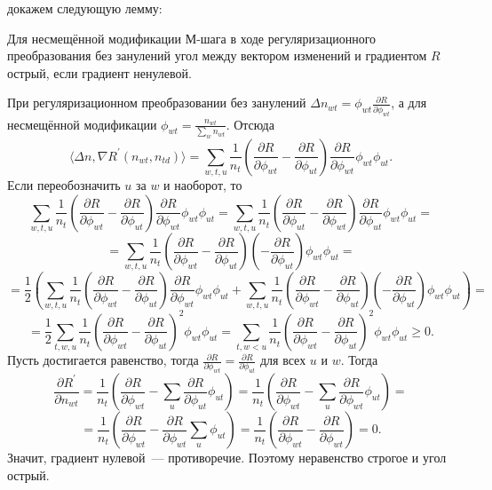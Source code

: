 \documentclass[12pt, twoside]{article}
\begin{document}
 докажем следующую лемму:
\begin{Lemma}           
Для несмещённой модификации М-шага в ходе регуляризационного преобразования  без занулений угол  между вектором изменений и градиентом $R$ острый, если градиент ненулевой.
\end{Lemma}
\begin{Proof}
При регуляризационном преобразовании без занулений $\Delta n_{wt} =  \phi_{wt} \frac{\partial{R}}{\partial{\phi_{wt}}}$, а для несмещённой модификации $\phi_{wt} = \frac{n_{wt}}{\sum\limits_w n_{wt}}$. Отсюда
\[
\langle \Delta n, \nabla R^{\prime}(n_{wt}, n_{td})\rangle = \sum\limits_{w, t, u}  \frac{1}{n_{t}}  \left(  \frac{\partial{R}}{\partial{\phi_{wt}}}  -  \frac{\partial{R}}{\partial{\phi_{ut}}}  \right)  \frac{\partial{R}}{\partial{\phi_{wt}}} \phi_{wt} \phi_{ut}.
\]
Если переобозначить $u$ за $w$ и наоборот, то 
\[
\sum\limits_{w, t, u}  \frac{1}{n_{t}}  \left(  \frac{\partial{R}}{\partial{\phi_{wt}}}  -  \frac{\partial{R}}{\partial{\phi_{ut}}}  \right)  \frac{\partial{R}}{\partial{\phi_{wt}}} \phi_{wt} \phi_{ut}  = \sum\limits_{w, t, u}  \frac{1}{n_{t}}  \left(  \frac{\partial{R}}{\partial{\phi_{ut}}}  -  \frac{\partial{R}}{\partial{\phi_{wt}}}  \right)  \frac{\partial{R}}{\partial{\phi_{ut}}} \phi_{wt} \phi_{ut} = 
\]
\[
= \sum\limits_{w, t, u}  \frac{1}{n_{t}}  \left(  \frac{\partial{R}}{\partial{\phi_{wt}}}  -  \frac{\partial{R}}{\partial{\phi_{ut}}}  \right)  \left(-\frac{\partial{R}}{\partial{\phi_{ut}}}\right) \phi_{wt} \phi_{ut} = 
\]
\[
= \frac12 \left(\sum\limits_{w, t, u}  \frac{1}{n_{t}}  \left(  \frac{\partial{R}}{\partial{\phi_{wt}}}  -  \frac{\partial{R}}{\partial{\phi_{ut}}}  \right)  \frac{\partial{R}}{\partial{\phi_{wt}}} \phi_{wt} \phi_{ut} +  \sum\limits_{w, t, u}  \frac{1}{n_{t}}  \left(  \frac{\partial{R}}{\partial{\phi_{wt}}}  -  \frac{\partial{R}}{\partial{\phi_{ut}}}  \right)  \left(-\frac{\partial{R}}{\partial{\phi_{ut}}}\right) \phi_{wt} \phi_{ut} \right)= 
\]
\[
= \frac12 \sum\limits_{t, w, u}  \frac{1}{n_{t}} \left(  \frac{\partial{R}}{\partial{\phi_{wt}}}  -  \frac{\partial{R}}{\partial{\phi_{ut}}}  \right)^2 \phi_{wt} \phi_{ut} = \sum\limits_{t, w < u}  \frac{1}{n_{t}} \left(  \frac{\partial{R}}{\partial{\phi_{wt}}}  -  \frac{\partial{R}}{\partial{\phi_{ut}}}  \right)^2 \phi_{wt} \phi_{ut} \geq 0.
\]
Пусть достигается равенство, тогда $\frac{\partial{R}}{\partial{\phi_{wt}}}  =  \frac{\partial{R}}{\partial{\phi_{ut}}}$ для всех $u$ и $w$. Тогда
\[
\frac{\partial{R^{\prime}}}{\partial{n_{wt}}} = \frac{1}{n_t} \left( \frac{\partial{R}}{\partial{\phi_{wt}}} - \sum_{u}  \frac{\partial{R}}{\partial{\phi_{ut}}} \phi_{ut} \right) = \frac{1}{n_t} \left( \frac{\partial{R}}{\partial{\phi_{wt}}} - \sum_{u}  \frac{\partial{R}}{\partial{\phi_{wt}}} \phi_{ut} \right) =
\]
\[
=\frac{1}{n_t} \left( \frac{\partial{R}}{\partial{\phi_{wt}}} - \frac{\partial{R}}{\partial{\phi_{wt}}} \sum_{u} \phi_{ut} \right)  = \frac{1}{n_t} \left( \frac{\partial{R}}{\partial{\phi_{wt}}} - \frac{\partial{R}}{\partial{\phi_{wt}}} \right) = 0.
\]
Значит, градиент нулевой~--- противоречие. Поэтому неравенство строгое и угол острый.
\end{Proof}
\medskip
\end{document}
